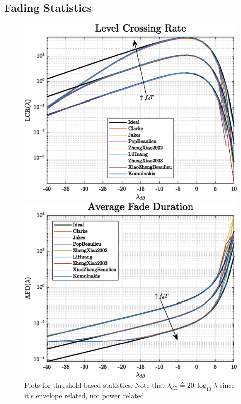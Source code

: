 \subsection{Fading Statistics}

\begin{figure}
	\hfill
	\begin{minipage}{.49\linewidth}
		\includegraphics[width=\linewidth]{img/multiLCR.eps}
	\end{minipage}
	\hfill
	\begin{minipage}{.49\linewidth}
		\includegraphics[width=\linewidth]{img/multiAFD.eps}
	\end{minipage}
	\hfill
	
	\caption{Plots for threshold-based statistics. Note that $\lambda_{dB} \triangleq 20\, \log_{10} \lambda$ since it's envelope related, not power related}
	\label{fig:LCR_AFD}
\end{figure}

